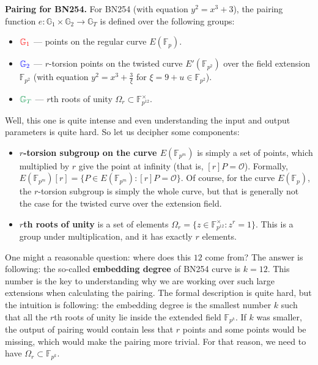 \documentclass[../lecture-notes.tex]{subfiles}
\begin{document}
\begin{example}
    \textbf{Pairing for BN254.} For BN254 (with equation $y^2=x^3+3$), the pairing function $e: \mathbb{G}_1 \times \mathbb{G}_2 \to \mathbb{G}_T$ is defined over the following groups:
    \begin{itemize}
        \item $\textcolor{red}{\mathbb{G}_1}$ --- points on the regular curve $E(\mathbb{F}_p)$.
        \item $\textcolor{blue}{\mathbb{G}_2}$ --- $r$-torsion points on the twisted curve $E'(\mathbb{F}_{p^2})$ over the field extension $\mathbb{F}_{p^2}$ (with equation $y^2 = x^3+\frac{3}{\xi}$ for $\xi=9+u \in \mathbb{F}_{p^2}$).
        \item $\textcolor{ForestGreen}{\mathbb{G}_T}$ --- $r$th roots of unity $\Omega_r \subset \mathbb{F}_{p^{12}}^{\times}$.
    \end{itemize}

    Well, this one is quite intense and even understanding the input and output parameters is quite hard. So let us decipher some components:
    \begin{itemize}
        \item \textbf{$r$-torsion subgroup on the curve $E(\mathbb{F}_{p^m})$} is simply a set of points, which multiplied by $r$ give the point at infinity (that is, $[r]P=\mathcal{O}$). Formally, $E(\mathbb{F}_{p^m})[r] = \{P \in E(\mathbb{F}_{p^m}): [r]P = \mathcal{O}\}$. Of course, for the curve $E(\mathbb{F}_p)$, the $r$-torsion subgroup is simply the whole curve, but that is generally not the case for the twisted curve over the extension field.
        \item \textbf{$r$th roots of unity} is a set of elements $\Omega_r = \{z \in \mathbb{F}_{p^{12}}^{\times}: z^r=1\}$. This is a group under multiplication, and it has exactly $r$ elements.
    \end{itemize}
\end{example}

\begin{remark}
    One might a reasonable question: where does this $12$ come from? The answer is following: the so-called \textbf{embedding degree} of BN254 curve is $k=12$. This number is the key to understanding why we are working over such large extensions when calculating the pairing. The formal description is quite hard, but the intuition is following: the embedding degree is the smallest number $k$ such that all the $r$th roots of unity lie inside the extended field $\mathbb{F}_{p^k}$. If $k$ was smaller, the output of pairing would contain less that $r$ points and some points would be missing, which would make the pairing more trivial. For that reason, we need to have $\Omega_r \subset \mathbb{F}_{p^k}$.
\end{remark}
\end{document}
